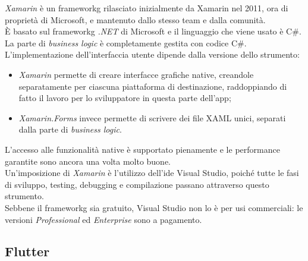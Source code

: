 \emph{Xamarin} è un \gls{frameworkg} rilasciato inizialmente da Xamarin nel 2011, ora di proprietà di Microsoft, e mantenuto dallo stesso team e dalla comunità.\\
È basato sul \gls{frameworkg} \emph{.NET} di Microsoft e il linguaggio che viene usato è C\#. La parte di \emph{business logic} è completamente gestita con codice C\#.\\
L'implementazione dell'interfaccia utente dipende dalla versione dello strumento:
\begin{itemize}
    \item \emph{Xamarin} permette di creare interfacce grafiche native, creandole separatamente per ciascuna piattaforma di destinazione, raddoppiando di fatto il lavoro per lo sviluppatore in questa parte dell'app;
    \item \emph{Xamarin.Forms} invece permette di scrivere dei file XAML unici, separati dalla parte di \emph{business logic}.
\end{itemize}
L'accesso alle funzionalità native è supportato pienamente e le performance garantite sono ancora una volta molto buone.\\
Un'imposizione di \emph{Xamarin} è l'utilizzo dell'\gls{ide} Visual Studio, poiché tutte le fasi di sviluppo, testing, debugging e compilazione passano attraverso questo strumento.\\
Sebbene il \gls{frameworkg} sia gratuito, Visual Studio non lo è per usi commerciali: le versioni \emph{Professional} ed \emph{Enterprise} sono a pagamento.

\subsection{Flutter}
\label{subsec:flutter}

